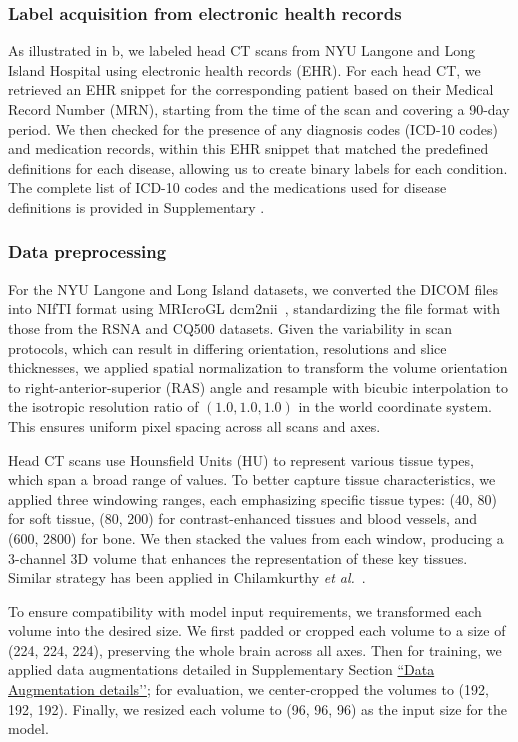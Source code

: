 \documentclass[fleqn,10pt]{wlscirep}
\begin{document}
\subsubsection*{Label acquisition from electronic health records}

As illustrated in b, we labeled head CT scans from NYU Langone and Long Island Hospital using electronic health records (EHR). For each head CT, we retrieved an EHR snippet for the corresponding patient based on their Medical Record Number (MRN), starting from the time of the scan and covering a 90-day period. We then checked for the presence of any diagnosis codes (ICD-10 codes) and medication records, within this EHR snippet that matched the predefined definitions for each disease, allowing us to create binary labels for each condition. The complete list of ICD-10 codes and the medications used for disease definitions is provided in Supplementary .


\subsubsection*{Data preprocessing}
For the NYU Langone and Long Island datasets, we converted the DICOM files into NIfTI format using MRIcroGL dcm2nii~\cite{li_first_2016}, standardizing the file format with those from the RSNA and CQ500 datasets. Given the variability in scan protocols, which can result in differing orientation, resolutions and slice thicknesses, we applied spatial normalization to transform the volume orientation to right-anterior-superior (RAS) angle and resample with bicubic interpolation to the isotropic resolution ratio of $(1.0, 1.0, 1.0)$ in the world coordinate system. This ensures uniform pixel spacing across all scans and axes. 

Head CT scans use Hounsfield Units (HU) to represent various tissue types, which span a broad range of values. To better capture tissue characteristics, we applied three windowing ranges, each emphasizing specific tissue types: (40, 80) for soft tissue, (80, 200) for contrast-enhanced tissues and blood vessels, and (600, 2800) for bone. We then stacked the values from each window, producing a 3-channel 3D volume that enhances the representation of these key tissues. Similar strategy has been applied in Chilamkurthy \textit{et al.}~\cite{CQ500}.

To ensure compatibility with model input requirements, we transformed each volume into the desired size. We first padded or cropped each volume to a size of (224, 224, 224), preserving the whole brain across all axes. Then for training, we applied data augmentations detailed in Supplementary Section \hyperref[sec:dataaug_details]{``Data Augmentation details’’}; for evaluation, we center-cropped the volumes to (192, 192, 192). Finally, we resized each volume to (96, 96, 96) as the input size for the model.
\end{document}
